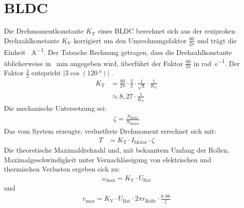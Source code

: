 	\section{BLDC}
		Die Drehmomentkonstante \(K_\text{T}\) eines BLDC berechnet sich aus der reziproken Drehzahlkonstante \(K_\text{V}\) korrigiert um den Umrechnungsfaktor \(\frac{60}{2\pi}\) und trägt die Einheit \unit{\newtonmetre\per\ampere}.
		Der Tatsache Rechnung getragen, dass die Drehzahlkonstante üblicherweise in \unit{\per\minute} angegeben wird, überführt der Faktor \(\frac{60}{2\pi}\) in \unit{\radian\per\second}.
		Der Faktor \(\frac{3}{2}\) entspricht \(\left| 3\cos(\qty{120}{\degree}) \right|\)  \cites{DalY.Ohm.2000}{APPNOTE.yedamale2003brushless}.
		\begin{align}
			K_\text{T}	&= \frac{60}{2\pi} \cdot \frac{3}{2} \cdot \frac{1}{\sqrt{3}} \cdot \frac{1}{K_\text{V}} \nonumber \\
				&\approx 8,27 \cdot \frac{1}{K_\text{V}}
			\label{eq:kv to kt}
		\end{align}
		Die mechanische Untersetzung sei:
		\begin{align}
			\zeta = \frac{N_\text{Rolle}}{N_\text{Motor}}
			\label{eq:reduction}
		\end{align}
		Das vom System erzeugte, verlustfreie Drehmoment errechnet sich mit:
		\begin{align}
			T	&= K_\text{T} \cdot I_\text{Motor} \cdot \zeta
			\label{eq:frictionless torque}
		\end{align}
		Die theoretische Maximaldrehzahl und, mit bekanntem Umfang der Rollen, Maximalgeschwindigkeit unter Vernachlässigung von elektrischen und thermischen Verlusten ergeben sich zu:
		\begin{align}
			\omega_\text{max} = K_\text{V} \cdot U_\text{Bat}
			\label{eq:max rpm}
		\end{align}
		und
		\begin{align}
			v_\text{max} = K_\text{V} \cdot U_\text{Bat} \cdot 2\pi r_\text{Rolle} \cdot \frac{0,06}{\zeta}
			\label{eq:max speed km h}
		\end{align}
		\nocite{Meschede.2015}\nocite{Demtroder.2018}